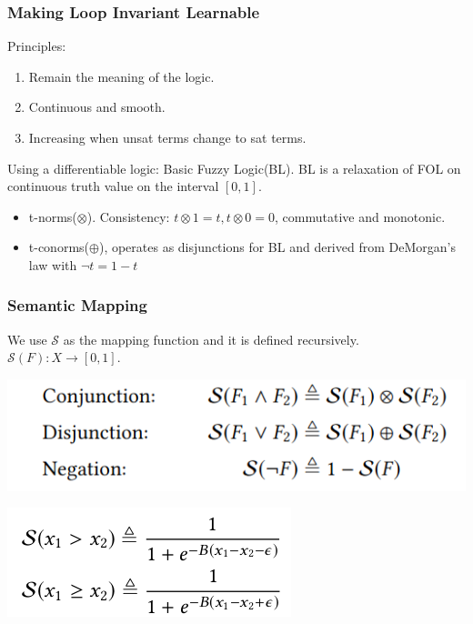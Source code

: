 \documentclass[11pt]{beamer}
\begin{document}
\begin{frame}\frametitle{Making Loop Invariant Learnable}

Principles:
\begin{enumerate}
\item Remain the meaning of the logic.
\item Continuous and smooth.
\item Increasing when unsat terms change to sat terms.
\end{enumerate}

Using a differentiable logic: Basic Fuzzy Logic(BL). BL is a relaxation of FOL on continuous truth value on the interval $[0,1]$.

\begin{itemize}
\item t-norms($\otimes$). Consistency: $t \otimes 1 = t, t \otimes 0 = 0$, commutative and monotonic.

\item t-conorms($\oplus$), operates as disjunctions for BL and derived from DeMorgan's law with $\neg t = 1 - t$ 
\end{itemize}




\end{frame}

\begin{frame}\frametitle{Semantic Mapping}
We use $\mathcal{S}$ as the mapping function and it is defined recursively. $\mathcal{S}(F) : X \rightarrow [0,1]$.
\begin{center}
\includegraphics[scale=0.4]{2.png}

\includegraphics[scale=0.4]{3.png}
\end{center}
\end{frame}
\end{document}
